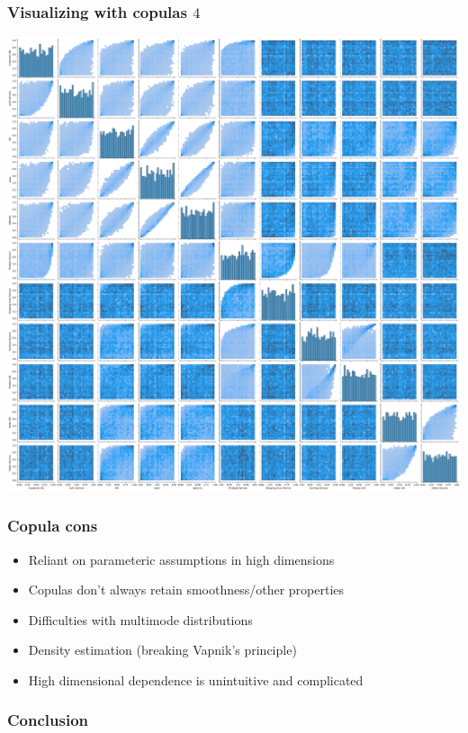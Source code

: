 \documentclass[18pt,aspectratio=149]{beamer}
\begin{document}
\begin{frame}
    \frametitle{Visualizing with copulas $4$}
    \begin{center}
        \includegraphics[height=0.8\textheight]{psuedocopulapairplot.png}
    \end{center}
\end{frame}


\begin{frame}
    \frametitle{Copula cons}
    \begin{itemize}
        \item Reliant on parameteric assumptions in high dimensions
        \item Copulas don't always retain smoothness/other properties
        \item Difficulties with multimode distributions
        \item Density estimation (breaking Vapnik's principle)
        \item High dimensional dependence is unintuitive and complicated
    \end{itemize}
\end{frame}



\begin{frame}
    \frametitle{Conclusion}
\end{frame}
\end{document}
